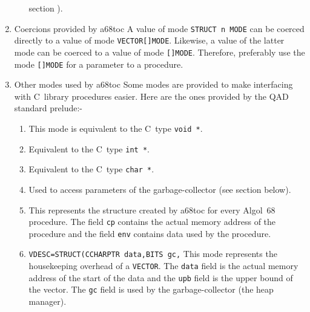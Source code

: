 \begin{enumerate}
\begin{enumerate}
section ).
\end{enumerate}
\item Coercions provided by a68toc\newline
A value of mode \verb|STRUCT n MODE| can be coerced directly to a value
of mode \verb|VECTOR[]MODE|. Likewise, a value of the latter mode can
be coerced to a value of mode \verb|[]MODE|. Therefore, preferably use
the mode \verb|[]MODE| for a parameter to a procedure.
\item Other modes used by a68toc\newline
Some modes are provided to make interfacing with C~library procedures
easier. Here are the ones provided by the QAD standard prelude:-
\begin{enumerate}
\item {}\newline
This mode is equivalent to the C~type \verb|void *|.
\item {}\newline
Equivalent to the C~type \verb|int *|.
\item {}\newline
Equivalent to the C~type \verb|char *|.
\item {}\newline
Used to access parameters of the garbage-coll\-ector (see section
 below).
\item {}
\newline
This represents the structure created by a68toc for every Algol~68
procedure. The field \verb|cp| contains the actual memory address of
the procedure and the field \verb|env| contains data used by the
procedure.
\item \verb|VDESC=STRUCT(CCHARPTR data,BITS gc,|\newline
{}\newline
This mode represents the housekeeping overhead of a \verb|VECTOR|.
The \verb|data| field is the actual memory address of the start of
the data and the \verb|upb| field is the upper bound of the vector.
The \verb|gc| field is used by the garbage-collector (the heap
manager).
\end{enumerate}
\end{enumerate}

